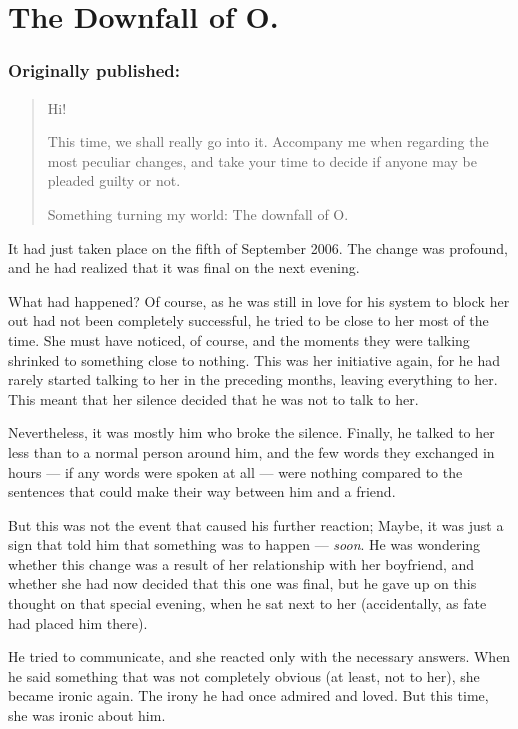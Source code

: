 \chapter{The Downfall of O.}
\label{cha:downfall-of-o}
\subsection*{Originally published: }
\begin{quote}
Hi!

This time, we shall really go into it. Accompany me when regarding the most peculiar changes, and take your time to decide if anyone may be pleaded guilty or not.

Something turning my world: The downfall of O.
\end{quote}

It had just taken place on the fifth of September 2006. The change was profound, and he had realized that it was final on the next evening.

What had happened? Of course, as he was still in love for his system to block her out had not been completely successful, he tried to be close to her most of the time. She must have noticed, of course, and the moments they were talking shrinked to something close to nothing. This was her initiative again, for he had rarely started talking to her in the preceding months, leaving everything to her. This meant that her silence decided that he was not to talk to her.

Nevertheless, it was mostly him who broke the silence. Finally, he talked to her less than to a normal person around him, and the few words they exchanged in hours --- if any words were spoken at all --- were nothing compared to the sentences that could make their way between him and a friend.

But this was not the event that caused his further reaction; Maybe, it was just a sign that told him that something was to happen --- \emph{soon}. He was wondering whether this change was a result of her relationship with her boyfriend, and whether she had now decided that this one was final, but he gave up on this thought on that special evening, when he sat next to her (accidentally, as fate had placed him there).

He tried to communicate, and she reacted only with the necessary answers. When he said something that was not completely obvious (at least, not to her), she became ironic again.
The irony he had once admired and loved. 
But this time, she was ironic about him.

